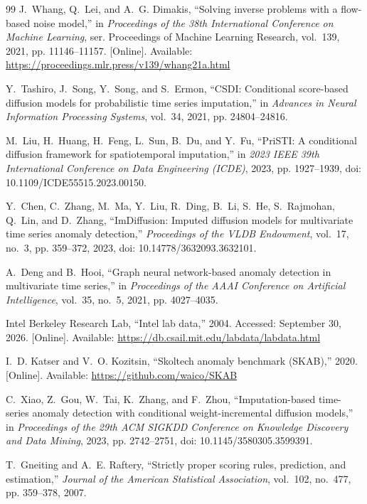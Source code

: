 \begin{thebibliography}{99}
J.~Whang, Q.~Lei, and A.~G. Dimakis, ``Solving inverse problems with
a flow-based noise model,'' in \emph{Proceedings of the 38th
International Conference on Machine Learning}, ser. Proceedings
of Machine Learning Research, vol.~139, 2021, pp. 11146--11157.
[Online]. Available:
\url{https://proceedings.mlr.press/v139/whang21a.html}

Y.~Tashiro, J.~Song, Y.~Song, and S.~Ermon, ``{CSDI}: Conditional
score-based diffusion models for probabilistic time series
imputation,'' in \emph{Advances in Neural Information Processing
Systems}, vol.~34, 2021, pp. 24804--24816.

M.~Liu, H.~Huang, H.~Feng, L.~Sun, B.~Du, and Y.~Fu, ``{PriSTI}:
A conditional diffusion framework for spatiotemporal imputation,''
in \emph{2023 IEEE 39th International Conference on Data Engineering
(ICDE)}, 2023, pp. 1927--1939,
doi: 10.1109/ICDE55515.2023.00150.

Y.~Chen, C.~Zhang, M.~Ma, Y.~Liu, R.~Ding, B.~Li, S.~He,
S.~Rajmohan, Q.~Lin, and D.~Zhang, ``{ImDiffusion}: Imputed
diffusion models for multivariate time series anomaly detection,''
\emph{Proceedings of the VLDB Endowment}, vol.~17, no.~3,
pp. 359--372, 2023, doi: 10.14778/3632093.3632101.

A.~Deng and B.~Hooi, ``Graph neural network-based anomaly detection
in multivariate time series,'' in \emph{Proceedings of the AAAI
Conference on Artificial Intelligence}, vol.~35, no.~5, 2021,
pp. 4027--4035.

{Intel Berkeley Research Lab}, ``Intel lab data,'' 2004.
Accessed: September 30, 2026. [Online]. Available:
\url{https://db.csail.mit.edu/labdata/labdata.html}

I.~D. Katser and V.~O. Kozitsin, ``Skoltech anomaly benchmark
({SKAB}),'' 2020. [Online]. Available:
\url{https://github.com/waico/SKAB}

C.~Xiao, Z.~Gou, W.~Tai, K.~Zhang, and F.~Zhou,
``Imputation-based time-series anomaly detection with conditional
weight-incremental diffusion models,'' in \emph{Proceedings of
the 29th ACM SIGKDD Conference on Knowledge Discovery and Data
Mining}, 2023, pp. 2742--2751,
doi: 10.1145/3580305.3599391.

T.~Gneiting and A.~E. Raftery, ``Strictly proper scoring rules,
prediction, and estimation,'' \emph{Journal of the American
Statistical Association}, vol.~102, no.~477, pp. 359--378, 2007.

\end{thebibliography}
